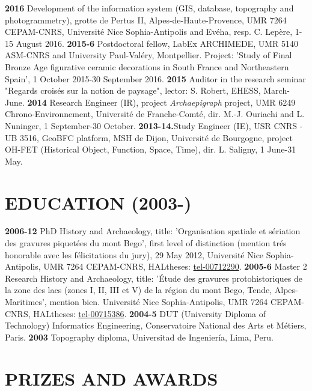 \documentclass{article}
\begin{document}
\smallbreak
\textbf{2016 }Development of the information system (GIS, database, topography and photogrammetry), grotte de Pertus II, Alpes-de-Haute-Provence, UMR 7264 CEPAM-CNRS, Universit\'{e} Nice Sophia-Antipolis and Ev\'{e}ha, resp. C. Lep\`{e}re, 1-15 August 2016.
\smallbreak
\textbf{2015-6 }Postdoctoral fellow, LabEx ARCHIMEDE, UMR 5140 ASM-CNRS and University Paul-Val\'{e}ry, Montpellier. Project: 'Study of Final Bronze Age figurative ceramic decorations in South France and Northeastern Spain', 1 October 2015-30 September 2016.
\smallbreak
\textbf{2015 }Auditor in the research seminar "Regards crois\'{e}s sur la notion de paysage", lector: S. Robert, EHESS, March-June.\textbf{}
\smallbreak
\textbf{2014 }Research Engineer (IR), project \textit{Archaepigraph} project, UMR 6249 Chrono-Environnement, Universit\'{e} de Franche-Comt\'{e}, dir. M.-J. Ouriachi and L. Nuninger, 1 September-30 October.
\smallbreak
\textbf{2013-14.}Study Engineer (IE), USR CNRS - UB 3516, GeoBFC platform, MSH de Dijon, Universit\'{e} de Bourgogne, project OH-FET (Historical Object, Function, Space, Time), dir. L. Saligny, 1 June-31 May.

\section{EDUCATION (2003-)}

\textbf{2006-12 }PhD History and Archaeology, title: 'Organisation spatiale et s\'{e}riation des gravures piquet\'{e}es du mont Bego', first level of distinction (mention tr\'{e}s honorable avec les f\'{e}licitations du jury), 29 May 2012, Universit\'{e} Nice Sophia-Antipolis, UMR 7264 CEPAM-CNRS, HALtheses: \href{https://tel.archives-ouvertes.fr/tel-00712290}{tel-00712290}.
\smallbreak
\textbf{2005-6 }Master 2 Research History and Archaeology, title: '\'{E}tude des gravures protohistoriques de la zone des lacs (zones I, II, III et V) de la r\'{e}gion du mont Bego, Tende, Alpes-Maritimes', mention bien. Universit\'{e} Nice Sophia-Antipolis, UMR 7264 CEPAM-CNRS, HALtheses: \href{https://tel.archives-ouvertes.fr/tel-00715386}{tel-00715386}.
\smallbreak
\textbf{2004-5 }DUT (University Diploma of Technology) Informatics Engineering, Conservatoire National des Arts et M\'{e}tiers, Paris.
\smallbreak
\textbf{2003 } Topography diploma, Universitad de Ingenier\'{i}a, Lima, Peru.

\section{PRIZES AND AWARDS}
\end{document}
